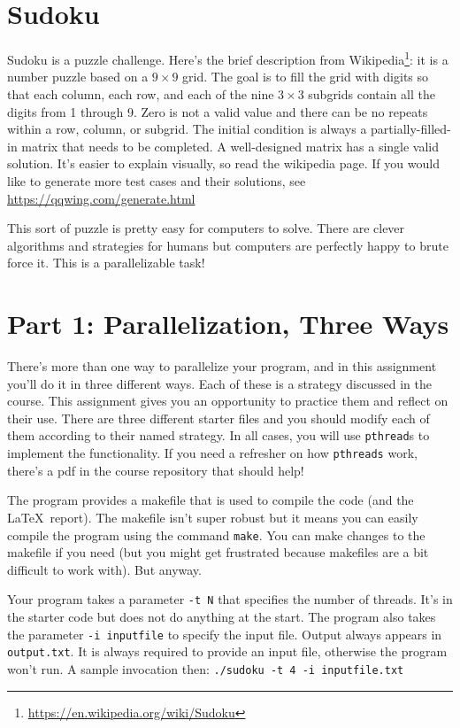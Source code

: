 \documentclass[letterpaper,10pt]{article}
\begin{document}
\section*{Sudoku}

Sudoku is a puzzle challenge. 
Here's the brief description from Wikipedia\footnote{
\url{https://en.wikipedia.org/wiki/Sudoku}}:
it is a number puzzle based on a $9\times9$ grid. The goal is to fill the
grid with digits so that each column, each row, and each of the nine
$3\times3$ subgrids contain all the digits from 1 through 9. Zero is not
a valid value and there can be no repeats within a row, column, or subgrid. 
The initial condition is always a partially-filled-in matrix that needs to 
be completed. A well-designed matrix has a single valid solution. 
It's easier to explain visually, so read the wikipedia page.
If you would like to generate
more test cases and their solutions, see
\url{https://qqwing.com/generate.html}


This sort of puzzle is pretty easy for computers to solve. There are clever
algorithms and strategies for humans but computers are perfectly happy to
brute force it. This is a parallelizable task!

\newpage

\section*{Part 1: Parallelization, Three Ways}

There's more than one way to parallelize your program, and in this
assignment you'll do it in three different ways. Each of these is a
strategy discussed in the course. This assignment gives you an opportunity
to practice them and reflect on their use. There are three different
starter files and you should modify each of them according to their named
strategy. In all cases, you will use \texttt{pthread}s to implement the 
functionality. If you need a refresher on how \texttt{pthreads} work,
there's a pdf in the course repository that should help! 

The program provides a makefile that is used to compile the code (and the
\LaTeX~report). The makefile isn't super robust but it means you can easily
compile the program using the command \texttt{make}. You can make changes
to the makefile if you need (but you might get frustrated because makefiles
are a bit difficult to work with). But anyway.

Your program takes a parameter \texttt{-t N} that specifies the number 
of threads. It's in the starter code but does not do anything at the start. 
The program also takes the parameter \texttt{-i inputfile} to specify the
input file. Output always appears in \texttt{output.txt}. It is always 
required to provide an input file, otherwise the program won't run.
A sample invocation then: \texttt{./sudoku -t 4 -i inputfile.txt}
\end{document}
